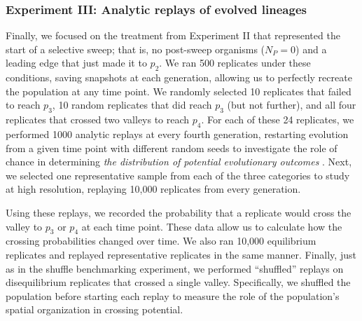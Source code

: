 \subsubsection{Experiment III: Analytic replays of evolved lineages}

Finally, we focused on the treatment from Experiment II that represented the start of a selective sweep; that is, no post-sweep organisms ($N_P=0$) and a leading edge that just made it to $p_{2}$. %
We ran 500 replicates under these conditions,
saving snapshots at each generation, allowing us to perfectly recreate the population at any time point. 
We randomly selected 10 replicates that failed to reach $p_{3}$, 10 random replicates that did reach $p_{3}$ (but not further), and all four replicates that crossed two valleys to reach $p_{4}$.
For each of these 24 replicates, we performed 1000 analytic replays at every fourth generation, restarting evolution from a given time point with different random seeds to investigate the role of chance in determining \textit{the distribution of potential evolutionary outcomes} \citep{blountContingencyDeterminismEvolution2018}.
Next, we selected one representative sample from each of the three categories to study at high resolution, replaying 10,000 replicates from every generation. 

Using these replays, we recorded the probability that a replicate would cross the valley to $p_{3}$ or $p_{4}$ at each time point. 
These data allow us to calculate how the crossing probabilities changed over time. 
We also ran 10,000 equilibrium replicates and replayed representative replicates in the same manner. 
Finally, just as in the shuffle benchmarking experiment, we performed ``shuffled'' replays on disequilibrium replicates that crossed a single valley.
Specifically, we shuffled the population before starting each replay to measure the role of the population's spatial organization in crossing potential. 


